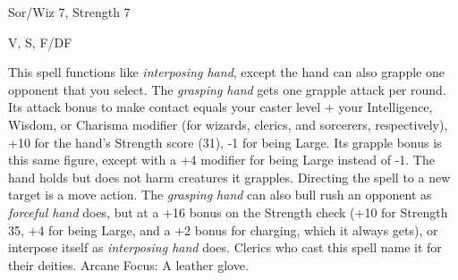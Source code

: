 
\begin{description*}
\item[Level:] Sor/Wiz 7, Strength 7
\item[Components:] V, S, F/DF
\end{description*}

This spell functions like \textit{interposing hand}, except the hand can also grapple
one opponent that you select. The \textit{grasping hand} gets one grapple attack
per round.
Its attack bonus to make contact equals your caster level + your Intelligence,
Wisdom, or Charisma modifier (for wizards, clerics, and sorcerers, respectively),
+10 for the hand's Strength score (31), -1 for being Large. Its grapple bonus is
this same figure, except with a +4 modifier for being Large instead of -1. The
hand holds but does not harm creatures it grapples.
Directing the spell to a new target is a move action.
The \textit{grasping hand} can also bull rush an opponent as \textit{forceful hand
}does, but at a +16 bonus on the Strength check (+10 for Strength 35, +4 for being
Large, and a +2 bonus for charging, which it always gets), or interpose itself
as \textit{interposing hand} does.
Clerics who cast this spell name it for their deities.
Arcane Focus: A leather glove.